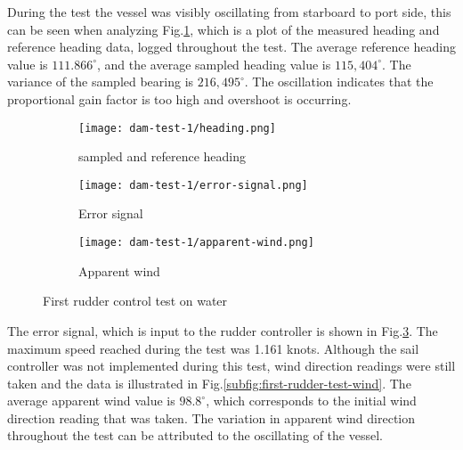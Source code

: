  
During the test the vessel was visibly oscillating from starboard to port side, this can be seen when analyzing Fig.\ref{subfig:first-rudder-control-heading}, which is a plot of the measured 
heading and reference heading data, logged throughout the test. The average reference heading value is $111.866^{\circ}$, and the average sampled heading value is $115,404^{\circ}$. The variance 
of the sampled bearing is $216,495^{\circ}$. The oscillation indicates that the proportional gain factor is too high and overshoot is occurring. 

\begin{figure}
    \centering
    \begin{subfigure}{=0.9\linewidth}
        \centering
        \texttt{[image: dam-test-1/heading.png]}
        \caption{sampled and reference heading}
        \label{subfig:first-rudder-control-heading}
    \end{subfigure}

    \begin{subfigure}{=0.9\linewidth}
        \centering
        \texttt{[image: dam-test-1/error-signal.png]}
        \caption{Error signal}
        \label{subfig:first-rudder-control-error}
    \end{subfigure}

    \begin{subfigure}{=0.9\linewidth}
        \centering
        \texttt{[image: dam-test-1/apparent-wind.png]}
        \caption{Apparent wind}
        \label{subfig:first-rudder-control-error}
    \end{subfigure}

    \caption[First rudder control test on water]{First rudder control test on water}
    \label{fig:first-rudder-control-water}
\end{figure}


The error signal, which is input to the rudder 
controller is shown in Fig.\ref{subfig:first-rudder-control-error}. The maximum speed reached during the test was 1.161 knots. Although the sail controller was not implemented during this test, 
wind direction readings were still taken and the data is illustrated in Fig.\ref{subfig:first-rudder-test-wind}. The average apparent wind value is $98.8^{\circ}$, which corresponds to the initial 
wind direction reading that was taken. The variation in apparent wind direction throughout the test can be attributed to the oscillating of the vessel.